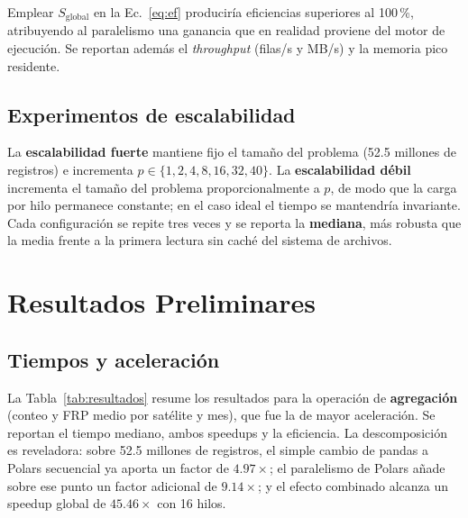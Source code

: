 \documentclass[conference]{IEEEtran}
\begin{document}
Emplear $S_{\text{global}}$ en la Ec.~\ref{eq:ef} produciría eficiencias superiores al 100\,\%, atribuyendo al paralelismo una ganancia que en realidad proviene del motor de ejecución. Se reportan además el \textit{throughput} (filas/s y MB/s) y la memoria pico residente.

\subsection{Experimentos de escalabilidad}
La \textbf{escalabilidad fuerte} mantiene fijo el tamaño del problema (52.5 millones de registros) e incrementa $p \in \{1,2,4,8,16,32,40\}$. La \textbf{escalabilidad débil} incrementa el tamaño del problema proporcionalmente a $p$, de modo que la carga por hilo permanece constante; en el caso ideal el tiempo se mantendría invariante. Cada configuración se repite tres veces y se reporta la \textbf{mediana}, más robusta que la media frente a la primera lectura sin caché del sistema de archivos.

\section{Resultados Preliminares}
\label{sec:resultados}

\subsection{Tiempos y aceleración}
La Tabla~\ref{tab:resultados} resume los resultados para la operación de \textbf{agregación} (conteo y FRP medio por satélite y mes), que fue la de mayor aceleración. Se reportan el tiempo mediano, ambos speedups y la eficiencia. La descomposición es reveladora: sobre 52.5 millones de registros, el simple cambio de pandas a Polars secuencial ya aporta un factor de $4.97\times$; el paralelismo de Polars añade sobre ese punto un factor adicional de $9.14\times$; y el efecto combinado alcanza un speedup global de $45.46\times$ con 16 hilos.
\end{document}

